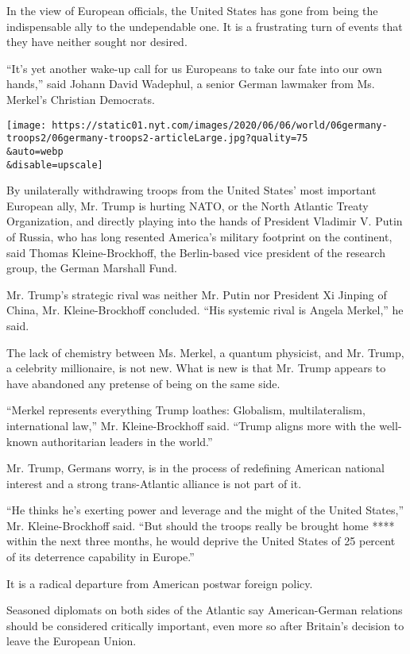 In the view of European officials, the United States has gone from being
the indispensable ally to the undependable one. It is a frustrating turn
of events that they have neither sought nor desired.

``It's yet another wake-up call for us Europeans to take our fate into
our own hands,'' said Johann David Wadephul, a senior German lawmaker
from Ms. Merkel's Christian Democrats.

\texttt{[image: https://static01.nyt.com/images/2020/06/06/world/06germany-troops2/06germany-troops2-articleLarge.jpg?quality=75\\\&auto=webp\\\&disable=upscale]}

By unilaterally withdrawing troops from the United States' most
important European ally, Mr. Trump is hurting NATO, or the North
Atlantic Treaty Organization, and directly playing into the hands of
President Vladimir V. Putin of Russia, who has long resented America's
military footprint on the continent, said Thomas Kleine-Brockhoff, the
Berlin-based vice president of the research group, the German Marshall
Fund.

Mr. Trump's strategic rival was neither Mr. Putin nor President Xi
Jinping of China, Mr. Kleine-Brockhoff concluded. ``His systemic rival
is Angela Merkel,'' he said.

The lack of chemistry between Ms. Merkel, a quantum physicist, and Mr.
Trump, a celebrity millionaire, is not new. What is new is that Mr.
Trump appears to have abandoned any pretense of being on the same side.

``Merkel represents everything Trump loathes: Globalism,
multilateralism, international law,'' Mr. Kleine-Brockhoff said. ``Trump
aligns more with the well-known authoritarian leaders in the world.''

Mr. Trump, Germans worry, is in the process of redefining American
national interest and a strong trans-Atlantic alliance is not part of
it.

``He thinks he's exerting power and leverage and the might of the United
States,'' Mr. Kleine-Brockhoff said. ``But should the troops really be
brought home **** within the next three months, he would deprive the
United States of 25 percent of its deterrence capability in Europe.''

It is a radical departure from American postwar foreign policy.

Seasoned diplomats on both sides of the Atlantic say American-German
relations should be considered critically important, even more so after
Britain's decision to leave the European Union.

